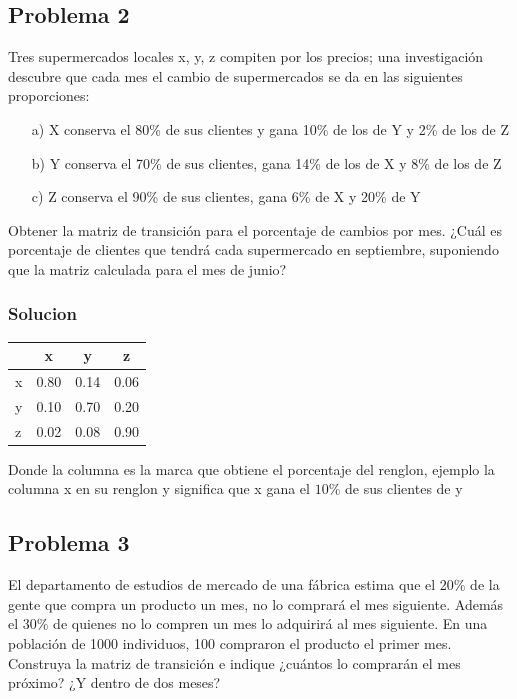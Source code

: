 \documentclass{article}
\begin{document}
\subsection*{Problema 2}

Tres supermercados locales x, y, z compiten por los precios; una investigación descubre que cada mes el cambio de supermercados se da en las siguientes proporciones:
\begin{itemize}
    \item[a)] X conserva el 80\% de sus clientes y gana 10\% de los de Y y 2\% de los de Z
    \item[b)] Y conserva el 70\% de sus clientes, gana 14\% de los de X y 8\% de los de Z
    \item[c)] Z conserva el 90\% de sus clientes, gana 6\% de X y 20\% de Y
\end{itemize}

Obtener la matriz de transición para el porcentaje de cambios por mes. ¿Cuál es porcentaje de clientes que tendrá cada supermercado en septiembre, suponiendo que la matriz calculada para el mes de junio?

\subsubsection*{Solucion}

\begin{table}[ht]
    \centering
    \begin{tabular}{|l|c c c|}
        \hline
          & x    & y    & z    \\ \hline
        x & 0.80 & 0.14 & 0.06 \\
        y & 0.10 & 0.70 & 0.20 \\
        z & 0.02 & 0.08 & 0.90 \\
        \hline
    \end{tabular}
\end{table}

Donde la columna es la marca que obtiene el porcentaje del renglon, ejemplo la columna x en su renglon y significa que x gana el $10\%$ de sus clientes de y

\newpage

\subsection*{Problema 3}

El departamento de estudios de mercado de una fábrica estima que el 20\% de la gente que compra un producto un mes, no lo comprará el mes siguiente. Además el 30\% de quienes no lo compren un mes lo adquirirá al mes siguiente. En una población de 1000 individuos, 100 compraron el producto el primer mes. Construya la matriz de transición e indique ¿cuántos lo comprarán el mes próximo? ¿Y dentro de dos meses?
\end{document}
